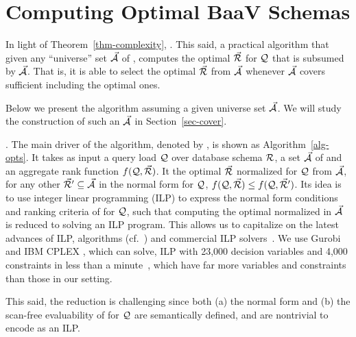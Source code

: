 \vspace{-0.7ex}
\section{Computing Optimal \textsf{BaaV} Schemas}
\label{sec-select}
\vspace{-0.4ex}

In light of Theorem~\ref{thm-complexity}, . 
This said,  a practical algorithm 
that given any ``universe'' set $\vec{{\mathcal A}}$ of \bss,
computes the optimal \bds $\vec{{\mathcal R}}$ for $\mathcal Q$ that is subsumed by
$\vec{{\mathcal A}}$. That is, it is able to select the optimal $\vec{{\mathcal R}}$
from  $\vec{{\mathcal A}}$ whenever $\vec{{\mathcal A}}$ covers sufficient \bss
including the optimal ones.


Below we present the algorithm assuming a given universe set $\vec{{\mathcal A}}$.
We will study the construction of such an $\vec{{\mathcal A}}$ in
Section~\ref{sec-cover}.





.
The main driver of the algorithm, denoted by \opts,
is shown as
Algorithm~\ref{alg-opts}. It takes as input a query load $\mathcal Q$ over
database schema ${\mathcal R}$, a set $\vec{{\mathcal A}}$ of \bss and an aggregate rank
function $f(\mathcal Q,\allowbreak \vec{{\mathcal R}})$.
It  %
the optimal \bds $\vec{{\mathcal R}}$ normalized for $\mathcal Q$ from $\vec{{\mathcal A}}$,
\ie for any other \bds $\vec{{\mathcal R}}'\allowbreak \subseteq \allowbreak \vec{{\mathcal A}}$ in the
normal form for $\mathcal Q$, $f(\mathcal Q,\allowbreak \vec{{\mathcal R}})\allowbreak \leq\allowbreak f(\mathcal Q,\allowbreak \vec{{\mathcal R}}')$.
%
Its  %
idea is to use integer linear programming (ILP) to
express the normal form conditions and ranking criteria of \bdss
for $\mathcal Q$, such that computing the optimal normalized \bds in $\vec{{\mathcal A}}$
is reduced to solving an ILP program. This allows us to 
capitalize on the latest advances of ILP, \eg algorithms
(cf.~\cite{ILPbook}) and commercial ILP
solvers~\cite{cplex,gurobi,XpressMP}. We use
Gurobi~\cite{gurobi} and IBM CPLEX \cite{cplex}, which can solve,
\eg ILP with 23,000 decision variables and 4,000  constraints
in less than a minute~\cite{ILPstat}, which have far more
variables and constraints than those in our setting.



This said, the reduction
is challenging since both (a) the normal form and (b) the
scan-free evaluability of \bdss for $\mathcal Q$ are semantically defined, 
and are nontrivial to encode as  an ILP.

